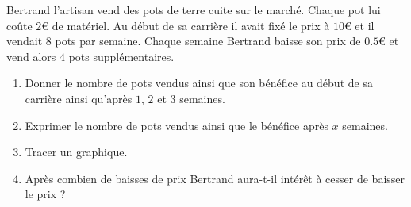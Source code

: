 
Bertrand l'artisan vend des pots de terre cuite sur le marché. Chaque pot lui coûte \( 2\)€ de matériel. Au début de sa carrière il avait fixé le prix à \( 10\)€ et il vendait \( 8\) pots par semaine. Chaque semaine Bertrand baisse son prix de \( 0.5\)€ et vend alors \( 4\) pots supplémentaires.

\begin{enumerate}
    \item
        Donner le nombre de pots vendus ainsi que son bénéfice au début de sa carrière ainsi qu'après \( 1\), \( 2\) et \( 3\) semaines.
    \item
        Exprimer le nombre de pots vendus ainsi que le bénéfice après \( x\) semaines.
    \item
        Tracer un graphique.
    \item
        Après combien de baisses de prix Bertrand aura-t-il intérêt à cesser de baisser le prix ?
\end{enumerate}
